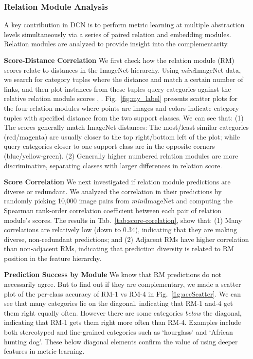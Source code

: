 \documentclass[conference]{IEEEtran}
\def\modelnameshort{DCN}
\def\miniIN{\textit{mini}ImageNet}
\def\imagenet{ImageNet}
\newcommand{\keypoint}[1]{\vspace{0.05cm}\noindent\textbf{#1}\quad}
\begin{document}
\subsubsection{Relation Module Analysis}
A key contribution in \modelnameshort{} is to perform metric learning at multiple abstraction levels simultaneously via a series of paired relation and embedding modules. Relation modules are analyzed to provide insight into the complementarity.

\keypoint{Score-Distance Correlation} We first check how the relation module (RM) scores relate to distances in the ImageNet hierarchy. Using \miniIN{} data, we search for  category tuples where the distance  and  match a certain number of links, and then plot instances from these tuples query categories against the relative relation module scores , . Fig.~\ref{fig:my_label} presents scatter plots for the four relation modules where points are images and colors indicate category tuples with specified distance from the two support classes. We can see that: (1) The scores generally match \imagenet{} distances: The most/least similar categories (red/magenta) are usually closer to the top right/bottom left of the plot; while query categories closer to one support class are in the opposite corners (blue/yellow-green). (2) Generally higher numbered relation modules are more discriminative, separating classes with larger differences in relation score. 

\keypoint{Score Correlation} We next investigated if relation module predictions are diverse or redundant. We analyzed the correlation in their predictions by randomly picking 10,000 image pairs from \miniIN{} and computing the Spearman rank-order correlation coefficient \cite{Spearman1904Proof} between each pair of relation module's scores. The results in Tab.~\ref{tab:score-corelation}, show that: (1) Many correlations are relatively low (down to 0.34), indicating that they are making diverse, non-redundant predictions; and (2) Adjacent RMs have higher correlation than non-adjacent RMs, indicating that prediction diversity is related to RM position in the feature hierarchy.

\keypoint{Prediction Success by Module} We know that RM predictions do not necessarily agree. But to find out if they are complementary, we made a scatter plot of the per-class accuracy of RM-1 vs RM-4 in Fig.~\ref{fig:accScatter}. We can see that many categories lie on the diagonal, indicating that RM-1 and-4 get them right equally often. However there are some categories \emph{below} the diagonal, indicating that RM-1 gets them right more often than RM-4. Examples include both stereotyped and fine-grained categories such as `hourglass' and `African hunting dog'. These below diagonal elements confirm the value of using deeper features in metric learning.
\end{document}
